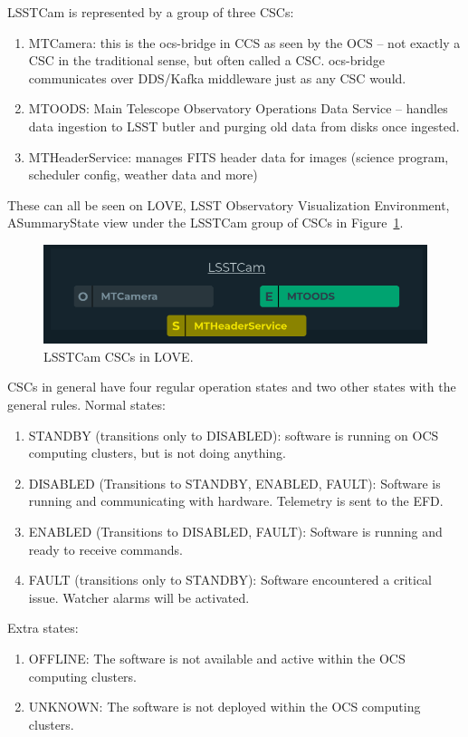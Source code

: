 LSSTCam is represented by a group of three CSCs:
\begin{enumerate}
    \item MTCamera: this is the ocs-bridge in CCS as seen by the OCS -- not exactly a CSC in the traditional sense, but  often called a CSC. ocs-bridge communicates over DDS/Kafka middleware just as any CSC would.
    \item MTOODS: Main Telescope Observatory Operations Data Service -- handles data ingestion to LSST butler and purging old data from disks once ingested.
    \item MTHeaderService: manages FITS header data for images (science program, scheduler config, weather data and more)
\end{enumerate}

These can all be seen on LOVE, LSST Observatory Visualization Environment, ASummaryState view under the LSSTCam group of CSCs in Figure~\ref{fig:app:lsstcamcsc}.
\begin{figure}
    \centering
    \includegraphics[width=0.6\linewidth]{figures/appendixFigs/lsstcamcsc.png}
    \caption{LSSTCam CSCs in LOVE.}
    \label{fig:app:lsstcamcsc}
\end{figure}

CSCs in general have four regular operation states and two other states with the general rules. Normal states:
\begin{enumerate}
    \item STANDBY (transitions only to DISABLED): software is running on OCS computing clusters, but is not doing anything.
    \item DISABLED (Transitions to STANDBY, ENABLED, FAULT): Software is running and communicating with hardware. Telemetry is sent to the EFD.
    \item ENABLED (Transitions to DISABLED, FAULT): Software is running and ready to receive commands.
    \item FAULT (transitions only to STANDBY): Software encountered a critical issue. Watcher alarms will be activated.
\end{enumerate}
Extra states:
\begin{enumerate}
    \item OFFLINE: The software is not available and active within the OCS computing clusters. 
    \item UNKNOWN: The software is not deployed within the OCS computing clusters. 
\end{enumerate}


